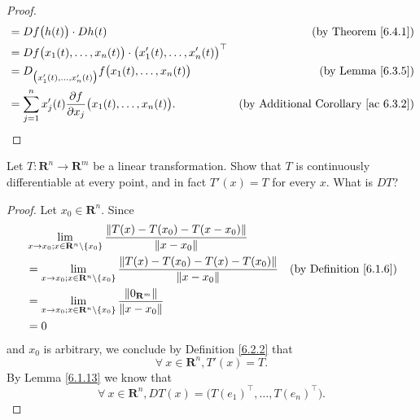 \begin{proof}
\begin{align*}
                                   & = D f\big(h(t)\big) \cdot D h(t)                                                         & \text{(by Theorem \ref{6.4.1})}                 \\
                                   & = D f\big(x_1(t), \dots, x_n(t)\big) \cdot \big(x_1'(t), \dots, x_n'(t)\big)^\top                                                          \\
                                   & = D_{\big(x_1'(t), \dots, x_n'(t)\big)} f\big(x_1(t), \dots, x_n(t)\big)                 & \text{(by Lemma \ref{6.3.5})}                   \\
                                   & = \sum_{j = 1}^n x_j'(t) \frac{\partial f}{\partial x_j}\big(x_1(t), \dots, x_n(t)\big). & \text{(by Additional Corollary \ref{ac 6.3.2})}
    \end{align*}
\end{proof}

\exercisesection

\begin{exercise}\label{ex 6.4.1}
    Let \(T : \mathbf{R}^n \to \mathbf{R}^m\) be a linear transformation.
    Show that \(T\) is continuously differentiable at every point, and in fact \(T'(x) = T\) for every \(x\).
    What is \(D T\)?
\end{exercise}

\begin{proof}
    Let \(x_0 \in \mathbf{R}^n\).
    Since
    \begin{align*}
         & \lim_{x \to x_0 ; x \in \mathbf{R}^n \setminus \{x_0\}} \frac{\norm*{T(x) - T(x_0) - T(x - x_0)}}{\norm*{x - x_0}}                                           \\
         & = \lim_{x \to x_0 ; x \in \mathbf{R}^n \setminus \{x_0\}} \frac{\norm*{T(x) - T(x_0) - T(x) - T(x_0)}}{\norm*{x - x_0}} & \text{(by Definition \ref{6.1.6})} \\
         & = \lim_{x \to x_0 ; x \in \mathbf{R}^n \setminus \{x_0\}} \frac{\norm*{0_{\mathbf{R}^m}}}{\norm*{x - x_0}}                                                   \\
         & = 0
    \end{align*}
    and \(x_0\) is arbitrary, we conclude by Definition \ref{6.2.2} that
    \[
        \forall\ x \in \mathbf{R}^n, T'(x) = T.
    \]
    By Lemma \ref{6.1.13} we know that
    \[
        \forall\ x \in \mathbf{R}^n, D T(x) = \big(T(e_1)^\top, \dots, T(e_n)^\top\big).
    \]
\end{proof}

